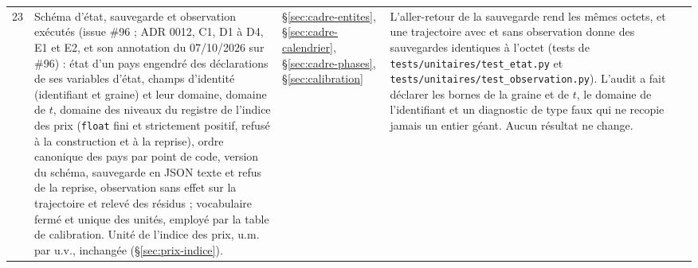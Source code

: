 \documentclass[11pt,a4paper]{article}
\begin{document}
\begin{center}
\begin{longtable}{p{0.5cm}>{\raggedright\arraybackslash}p{6.3cm}>{\raggedright\arraybackslash}p{2.1cm}>{\raggedright\arraybackslash}p{5.8cm}}
23 & Schéma d'état, sauvegarde et observation exécutés (issue \#96 ; ADR 0012, C1, D1 à D4, E1 et E2, et son annotation du 07/10/2026 sur \#96) : état d'un pays engendré des déclarations de ses variables d'état, champs d'identité (identifiant et graine) et leur domaine, domaine de $t$, domaine des niveaux du registre de l'indice des prix (\texttt{float} fini et strictement positif, refusé à la construction et à la reprise), ordre canonique des pays par point de code, version du schéma, sauvegarde en JSON texte et refus de la reprise, observation sans effet sur la trajectoire et relevé des résidus ; vocabulaire fermé et unique des unités, employé par la table de calibration. Unité de l'indice des prix, u.m. par u.v., inchangée (\S\ref{sec:prix-indice}). & \S\ref{sec:cadre-entites}, \S\ref{sec:cadre-calendrier}, \S\ref{sec:cadre-phases}, \S\ref{sec:calibration} & L'aller-retour de la sauvegarde rend les mêmes octets, et une trajectoire avec et sans observation donne des sauvegardes identiques à l'octet (tests de \nolinkurl{tests/unitaires/test_etat.py} et \nolinkurl{tests/unitaires/test_observation.py}). L'audit a fait déclarer les bornes de la graine et de $t$, le domaine de l'identifiant et un diagnostic de type faux qui ne recopie jamais un entier géant. Aucun résultat ne change.\\

\end{longtable}
\end{center}
\end{document}
